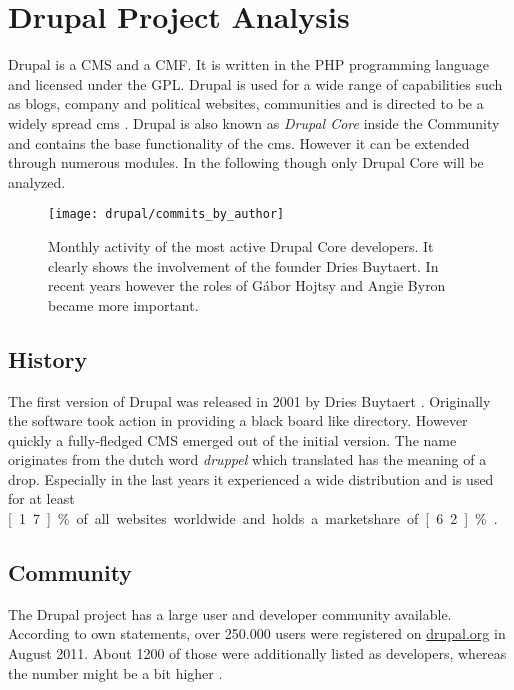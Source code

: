 \section{Drupal Project Analysis} %


Drupal is a \ac{CMS} and a \ac{CMF}. It is written in the PHP programming
language and licensed under the \ac{GPL}. Drupal is used for a wide range
of capabilities such as blogs, company and political websites, communities and
is directed to be a widely spread cms \cite{DrupalOverview}. Drupal is also
known as \emph{Drupal Core} inside the Community and contains the base
functionality of the cms. However it can be extended through numerous modules.
In the following though only Drupal Core will be analyzed.

\begin{figure}[htbp]
  \centering
  \texttt{[image: drupal/commits\_by\_author]}
  \caption{Monthly activity of the most active Drupal Core developers. It
  clearly shows the involvement of the founder Dries Buytaert. In recent years
  however the roles of Gábor Hojtsy and Angie Byron became more important.}
\end{figure}

\subsection{History} %

The first version of Drupal was released in 2001 by Dries Buytaert
\cite{DrupalHistory}. Originally the software took action in providing a black
board like directory. However quickly a fully-fledged \ac{CMS} emerged out of
the initial version. The name originates from the dutch word \emph{druppel}
which translated has the meaning of a drop. Especially in the last years it
experienced a wide distribution and is used for at least \unit[1.7]{\%} of all
websites worldwide and holds a marketshare of \unit[6.2]{\%}
\cite{DrupalBuiltWith,DrupalW3Techs}.


\subsection{Community} %

The Drupal project has a large user and developer community available.
According to own statements, over 250.000 users were registered on
\url{drupal.org} in August 2011. About 1200 of those were additionally listed
as developers, whereas the number might be a bit higher \cite{DrupalBuytaert}.

